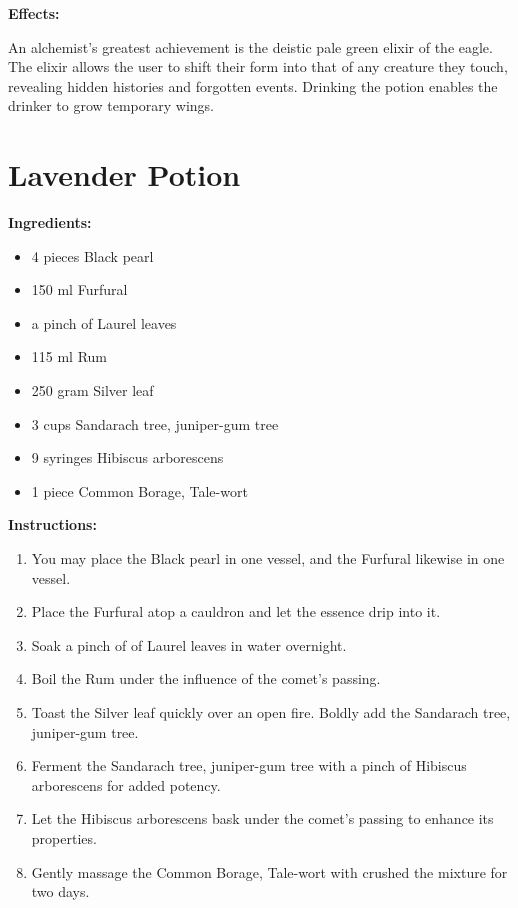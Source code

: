 \documentclass{article}
\begin{document}
\textbf{Effects:}

An alchemist's greatest achievement is the deistic pale green elixir of the eagle. The elixir allows the user to shift their form into that of any creature they touch, revealing hidden histories and forgotten events. Drinking the potion enables the drinker to grow temporary wings.

\newpage
\section*{Lavender Potion}

\textbf{Ingredients:}

\begin{itemize}
  \item 4 pieces Black pearl
  \item 150 ml Furfural
  \item a pinch of Laurel leaves
  \item 115 ml Rum
  \item 250 gram Silver leaf
  \item 3 cups Sandarach tree, juniper-gum tree
  \item 9 syringes Hibiscus arborescens
  \item 1 piece Common Borage, Tale-wort
\end{itemize}

\textbf{Instructions:}

\begin{enumerate}
  \item You may place the Black pearl in one vessel, and the Furfural likewise in one vessel.
  \item Place the Furfural atop a cauldron and let the essence drip into it.
  \item Soak a pinch of of Laurel leaves in water overnight.
  \item Boil the Rum under the influence of the comet’s passing.
  \item Toast the Silver leaf quickly over an open fire. Boldly add the Sandarach tree, juniper-gum tree.
  \item Ferment the Sandarach tree, juniper-gum tree with a pinch of Hibiscus arborescens for added potency.
  \item Let the Hibiscus arborescens bask under the comet’s passing to enhance its properties.
  \item Gently massage the Common Borage, Tale-wort with crushed the mixture for two days.
\end{enumerate}
\end{document}

